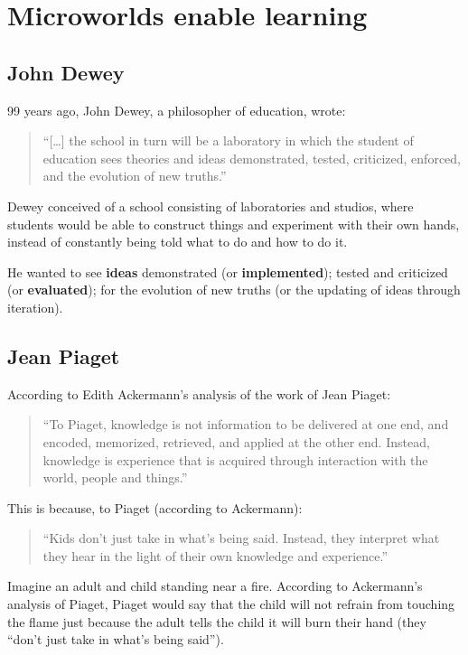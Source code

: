 \section{Microworlds enable learning}

\subsection{John Dewey}

99 years ago, John Dewey, a philosopher of education, wrote:

\begin{quote}
``{[}\ldots{}{]} the school in turn will be a laboratory in which the
student of education sees theories and ideas demonstrated, tested,
criticized, enforced, and the evolution of new truths.''\cite[p55]{dewey}
\end{quote}

Dewey conceived of a school consisting of laboratories and studios,
where students would be able to construct things and experiment with
their own hands, instead of constantly being told what to do
and how to do it.

He wanted to see \textbf{ideas} demonstrated (or \textbf{implemented});
tested and criticized (or \textbf{evaluated}); for the evolution of new
truths (or the updating of ideas through iteration).

\subsection{Jean Piaget}

According to Edith Ackermann's analysis of the work of Jean Piaget:

\begin{quote}
``To Piaget, knowledge is not information to be delivered at one end, and
encoded, memorized, retrieved, and applied at the other end. Instead,
knowledge is experience that is acquired through interaction with the
world, people and things.''\cite{ackermann}
\end{quote}

This is because, to Piaget (according to Ackermann):

\begin{quote}
``Kids don't just take in what's being said. Instead, they interpret what
they hear in the light of their own knowledge and experience.''\cite{ackermann}
\end{quote}

Imagine an adult and child standing near a fire. According to
Ackermann's analysis of Piaget, Piaget would say that the child will not
refrain from touching the flame just because the adult tells the child
it will burn their hand (they ``don't just take in what's being said'').

